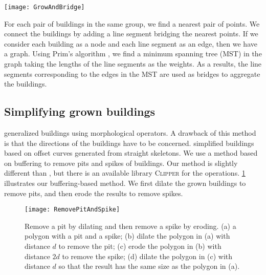 \begin{figure*}[tb]
	\centering
	\texttt{[image: GrowAndBridge]}
	\caption{Aggregate original buildings in the same group by introducing 
	bridges.
		Then grow the bridged buildings.}
	\label{fig:GrowAndBridge}
\end{figure*}

For each pair of buildings in the same group, 
we find a nearest pair of points.
We connect the buildings by adding a line segment bridging the nearest points.
If we consider each building as a node and each line segment as an edge, 
then we have a graph.
Using Prim's algorithm \citep{Prim1957}, 
we find a minimum spanning tree (MST) in the graph
taking the lengths of the line segments as the weights.
As a results, the line segments corresponding to the edges in the MST
are used as bridges to aggregate the buildings.

\subsection{Simplifying grown buildings}
\label{sec:Simplify}
\citet{Damen2008} generalized buildings using morphological operators.
A drawback of this method is that the directions of the buildings have to be 
concerned.
\citet{Meijers2016} simplified buildings 
based on offset curves generated from straight skeletons.
We use a method based on buffering to remove pits and spikes of buildings.
Our method is slightly different than \citet{Meijers2016},
but there is an available library \textsc{Clipper} \citep{Johnson2014} 
for the operations.
\fig\ref{fig:RemovePitAndSpike} illustrates our buffering-based method.
We first dilate the grown buildings to remove 
pits, and then erode the results to remove spikes.

\begin{figure}[tb]
	\centering
	\texttt{[image: RemovePitAndSpike]}
	\caption{Remove a pit by dilating and then remove a spike by eroding.
		(a) a polygon with a pit and a spike;
		(b) dilate the polygon in (a) with distance $d$ to remove the pit;
		(c) erode the polygon in (b) with distance $2d$ to remove the spike;
		(d) dilate the polygon in (c) with distance $d$ so that the result has 
		the same size as the polygon in (a).
	}
	\label{fig:RemovePitAndSpike}
\end{figure}

